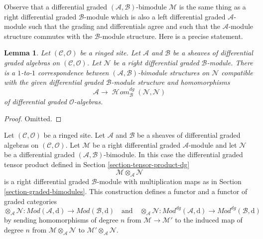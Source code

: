 \documentclass{stacks-project}
\theoremstyle{plain}
\newtheorem{lemma}[subsection]{Lemma}
\theoremstyle{definition}
\theoremstyle{remark}
\numberwithin{equation}{subsection}
\def\SheafHom{\mathop{\mathcal{H}\!\mathit{om}}\nolimits}
\begin{document}
\medskip\noindent
Observe that a differential graded $(\mathcal{A}, \mathcal{B})$-bimodule
$\mathcal{M}$ is the same thing as a right differential graded
$\mathcal{B}$-module which is also a left differential graded
$\mathcal{A}$-module such that the grading and differentials agree
and such that the $\mathcal{A}$-module structure commutes with
the $\mathcal{B}$-module structure. Here is a precise statement.

\begin{lemma}
\label{lemma-what-makes-a-bimodule-dg}
Let $(\mathcal{C}, \mathcal{O})$ be a ringed site. Let $\mathcal{A}$
and $\mathcal{B}$ be a sheaves of differential graded algebras on
$(\mathcal{C}, \mathcal{O})$. Let $\mathcal{N}$ be a right differential
graded $\mathcal{B}$-module. There is a $1$-to-$1$ correspondence
between $(\mathcal{A}, \mathcal{B})$-bimodule structures on
$\mathcal{N}$ compatible with the given
differential graded $\mathcal{B}$-module structure and homomorphisms
$$
\mathcal{A}
\longrightarrow
\SheafHom^{dg}_\mathcal{B}(\mathcal{N}, \mathcal{N})
$$
of differential graded $\mathcal{O}$-algebras.
\end{lemma}

\begin{proof}
Omitted.
\end{proof}

\noindent
Let $(\mathcal{C}, \mathcal{O})$ be a ringed site. Let $\mathcal{A}$
and $\mathcal{B}$ be a sheaves of differential graded algebras on
$(\mathcal{C}, \mathcal{O})$. Let $\mathcal{M}$ be a right
differential graded $\mathcal{A}$-module and let $\mathcal{N}$ be a
differential graded $(\mathcal{A}, \mathcal{B})$-bimodule. In this case the
differential graded tensor product defined in
Section \ref{section-tensor-product-dg}
$$
\mathcal{M} \otimes_\mathcal{A} \mathcal{N}
$$
is a right differential graded $\mathcal{B}$-module with
multiplication maps as in Section \ref{section-graded-bimodules}.
This construction defines a functor and a functor of graded categories
$$
\otimes_\mathcal{A} \mathcal{N} :
\textit{Mod}(\mathcal{A}, \text{d})
\longrightarrow
\textit{Mod}(\mathcal{B}, \text{d})
\quad\text{and}\quad
\otimes_\mathcal{A} \mathcal{N} :
\textit{Mod}^{dg}(\mathcal{A}, \text{d})
\longrightarrow
\textit{Mod}^{dg}(\mathcal{B}, \text{d})
$$
by sending homomorphisms of degree $n$ from $\mathcal{M} \to \mathcal{M}'$
to the induced map of degree $n$ from
$\mathcal{M} \otimes_\mathcal{A} \mathcal{N}$ to
$\mathcal{M}' \otimes_\mathcal{A} \mathcal{N}$.
\end{document}
